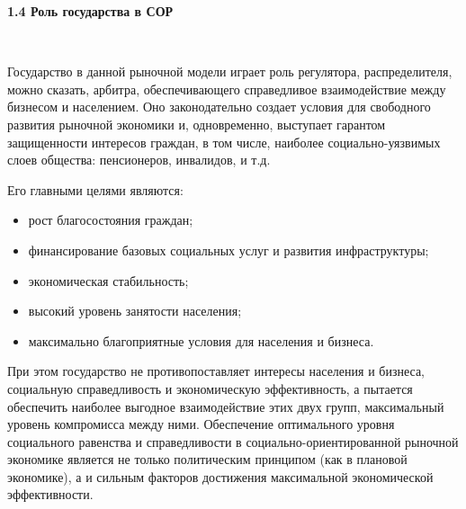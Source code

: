 \documentclass[14pt,a4paper]{article}
\begin{document}
    \begin{center}
        \textbf{1.4 Роль государства в СОР}
    \end{center}
    \\
    \par
    Государство в данной рыночной модели играет роль регулятора, распределителя,
    можно сказать, арбитра, обеспечивающего справедливое взаимодействие между бизнесом и
    населением. Оно законодательно создает условия для свободного развития рыночной экономики и,
    одновременно, выступает гарантом защищенности интересов граждан, в том числе, наиболее
    социально-уязвимых слоев общества: пенсионеров, инвалидов, и т.д.
    \par
    Его главными целями являются:
    \begin{itemize}
        \item рост благосостояния граждан;
        \item финансирование базовых социальных услуг и развития инфраструктуры;
        \item экономическая стабильность;
        \item высокий уровень занятости населения;
        \item максимально благоприятные условия для населения и бизнеса.
    \end{itemize}
    \par
    При этом государство не противопоставляет интересы населения и бизнеса, социальную
    справедливость и экономическую эффективность, а пытается обеспечить наиболее выгодное
    взаимодействие этих двух групп, максимальный уровень компромисса между ними.
    Обеспечение оптимального уровня социального равенства и справедливости в
    социально-ориентированной рыночной экономике является не только политическим принципом
    (как в плановой экономике), а и сильным факторов достижения максимальной экономической
    эффективности.
    \par
\end{document}

